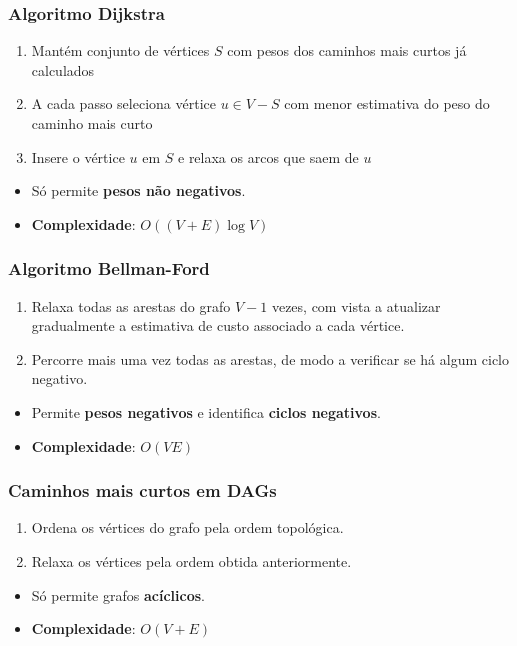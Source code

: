 \documentclass[11pt]{article}
\begin{document}
\subsubsection{Algoritmo Dijkstra}

\begin{enumerate}
    \item Mantém conjunto de vértices $S$ com pesos dos caminhos mais curtos já calculados
    \item A cada passo seleciona vértice $u \in V-S$ com menor estimativa do peso do caminho mais curto
    \item Insere o vértice $u$ em $S$ e relaxa os arcos que saem de $u$
\end{enumerate}
\begin{itemize}[topsep=0pt]
    \item Só permite \textbf{pesos não negativos}.
    \item \textbf{Complexidade}: $O((V+E)\log V)$
\end{itemize}

\subsubsection{Algoritmo Bellman-Ford}

\begin{enumerate}
    \item Relaxa todas as arestas do grafo $V-1$ vezes, com vista a atualizar gradualmente a estimativa de custo associado a cada vértice.
    \item Percorre mais uma vez todas as arestas, de modo a verificar se há algum ciclo negativo.
\end{enumerate}
\begin{itemize}[topsep=0pt]
    \item Permite \textbf{pesos negativos} e identifica \textbf{ciclos negativos}.
    \item \textbf{Complexidade}: $O(VE)$
\end{itemize}

\subsubsection{Caminhos mais curtos em DAGs}

\begin{enumerate}
    \item Ordena os vértices do grafo pela ordem topológica.
    \item Relaxa os vértices pela ordem obtida anteriormente.
\end{enumerate}
\begin{itemize}[topsep=0pt]
    \item Só permite grafos \textbf{acíclicos}.
    \item \textbf{Complexidade}: $O(V + E)$
\end{itemize}
\end{document}
